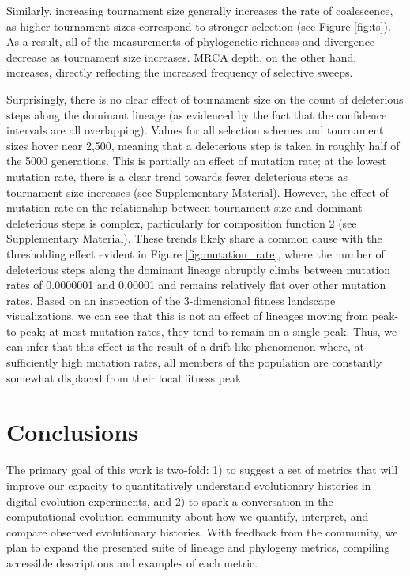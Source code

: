 \documentclass[letterpaper]{article}
\begin{document}
Similarly, increasing tournament size generally increases the rate of coalescence, as higher tournament sizes correspond to stronger selection (see Figure \ref{fig:ts}). As a result, all of the measurements of phylogenetic richness and divergence decrease as tournament size increases. MRCA depth, on the other hand, increases, directly reflecting the increased frequency of selective sweeps. 

Surprisingly, there is no clear effect of tournament size on the count of deleterious steps along the dominant lineage (as evidenced by the fact that the confidence intervals are all overlapping). Values for all selection schemes and tournament sizes hover near 2,500, meaning that a deleterious step is taken in roughly half of the 5000 generations. This is partially an effect of mutation rate; at the lowest mutation rate, there is a clear trend towards fewer deleterious steps as tournament size increases (see Supplementary Material). However, the effect of mutation rate on the relationship between tournament size and dominant deleterious steps is complex, particularly for composition function 2 (see Supplementary Material). These trends likely share a common cause with the thresholding effect evident in Figure \ref{fig:mutation_rate}, where the number of deleterious steps along the dominant lineage abruptly climbs between mutation rates of 0.0000001 and 0.00001 and remains relatively flat over other mutation rates. Based on an inspection of the 3-dimensional fitness landscape visualizations, we can see that this is not an effect of lineages moving from peak-to-peak; at most mutation rates, they tend to remain on a single peak. Thus, we can infer that this effect is the result of a drift-like phenomenon where, at sufficiently high mutation rates, all members of the population are constantly somewhat displaced from their local fitness peak.


\section{Conclusions}


The primary goal of this work is two-fold: 1) to suggest a set of metrics that will improve our capacity to quantitatively understand evolutionary histories in digital evolution experiments, and 2) to spark a conversation in the computational evolution community about how we quantify, interpret, and compare observed evolutionary histories. With feedback from the community, we plan to expand the presented suite of lineage and phylogeny metrics, compiling accessible descriptions and examples of each metric. 
\end{document}
